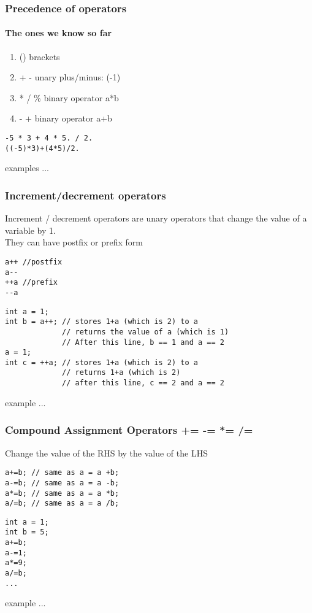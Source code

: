 \documentclass[10pt]{beamer}
\begin{document}
\begin{frame}[fragile]
  \frametitle{Precedence of operators}
  \framesubtitle{The ones we know so far}
  \centering
  \begin{enumerate}
    \item () brackets
    \item + - unary plus/minus: (-1)
    \item * / \% binary operator a*b
    \item - + binary operator a+b
  \end{enumerate}

\begin{lstlisting}
-5 * 3 + 4 * 5. / 2. 
((-5)*3)+(4*5)/2.
\end{lstlisting}

examples ...

\end{frame}

\begin{frame}[fragile]
  \frametitle{Increment/decrement operators}
  Increment / decrement operators are unary operators that change the value of a variable by 1.\\
  They can have postfix or prefix form

\begin{lstlisting}
a++ //postfix
a--
++a //prefix
--a
\end{lstlisting}

\begin{lstlisting}
int a = 1;
int b = a++; // stores 1+a (which is 2) to a
             // returns the value of a (which is 1)
             // After this line, b == 1 and a == 2
a = 1;
int c = ++a; // stores 1+a (which is 2) to a
             // returns 1+a (which is 2)
             // after this line, c == 2 and a == 2
\end{lstlisting}

example ...

\end{frame}

\begin{frame}[fragile]
  \frametitle{Compound Assignment Operators += -= *= /=}
  Change the value of the RHS by the value of the LHS

\begin{lstlisting}
a+=b; // same as a = a +b;
a-=b; // same as a = a -b;
a*=b; // same as a = a *b;
a/=b; // same as a = a /b;
\end{lstlisting}

\begin{lstlisting}
int a = 1;
int b = 5;
a+=b;
a-=1;
a*=9;
a/=b;
...
\end{lstlisting}

example ...

\end{frame}
\end{document}
